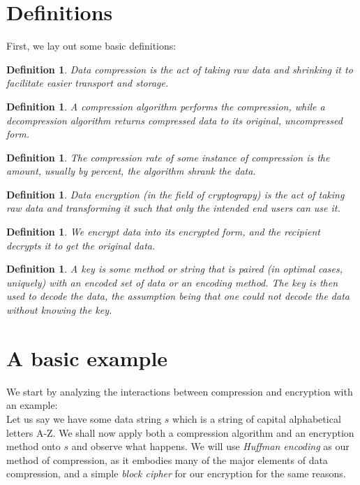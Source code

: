 \documentclass[11pt]{article}
\newtheorem{defn}[thm]{Definition}{\bfseries}{\rmfamily}
\begin{document}
\section{Definitions}\label{def-sect}
First, we lay out some basic definitions:
\begin{defn}
\emph{Data compression} is the act of taking raw data and shrinking it to facilitate easier transport and storage. 
\end{defn}
\begin{defn}
A \emph{compression algorithm} performs the compression, while a \emph{decompression algorithm} returns 
compressed data to its original, uncompressed form.
\end{defn}
\begin{defn}
The \emph{compression rate} of some instance of compression is the amount, usually by percent, the algorithm 
shrank the data. 
\end{defn}
\begin{defn}
\emph{Data encryption} (in the field of \emph{cryptograpy}) is the act of taking raw data and transforming it 
such that only the intended end users can use it.
\end{defn}
\begin{defn}
We \emph{encrypt} data into its encrypted form, and the recipient \emph{decrypts} it to get the original data. 
\end{defn}
\begin{defn}
A \emph{key} is some method or string that is paired (in optimal cases, uniquely) with an encoded set of data or 
an encoding method. The key is then used to decode the data, the assumption being that one could not decode the 
data without knowing the key.
\end{defn}

\section{A basic example}\label{simple-example-sect}
We start by analyzing the interactions between compression and encryption with an example:\\
Let us say we have some data string $s$ which is a string of capital alphabetical letters A-Z. 
We shall now apply both a compression algorithm and an encryption method onto $s$ and observe what happens.  
We will use \emph{Huffman encoding}\cite{huffman} as our method of compression, as it embodies many of the 
major elements of data compression, and a simple \emph{block cipher} for our encryption for the same reasons.
\end{document}
